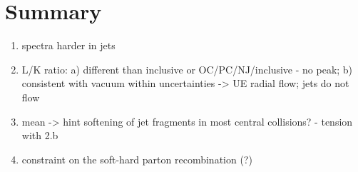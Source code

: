 
\section{Summary}

\begin{enumerate}
	\item spectra harder in jets
	\item L/K ratio: a) different than inclusive or OC/PC/NJ/inclusive - no peak; b) consistent with vacuum within uncertainties -> UE radial flow; jets do not flow
	\item mean \pt -> hint softening of jet fragments in most central collisions? - tension with 2.b
	\item constraint on the soft-hard parton recombination (?)
\end{enumerate}

